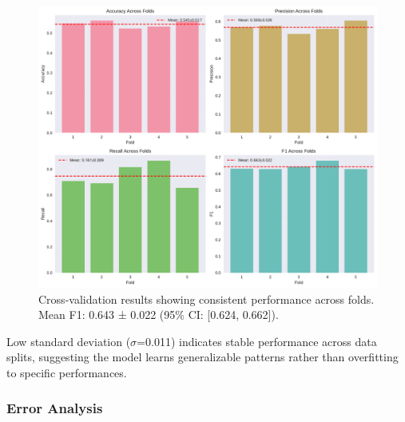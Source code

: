 \documentclass[sigconf,review,anonymous]{acmart}
\begin{document}
\begin{figure}[h]
\centering
\includegraphics[width=\columnwidth]{figures/cross_validation_results.pdf}
\caption{Cross-validation results showing consistent performance across folds. Mean F1: 0.643 ± 0.022 (95\% CI: [0.624, 0.662]).}
\label{fig:crossval}
\end{figure}

Low standard deviation ($\sigma$=0.011) indicates stable performance across data splits, suggesting the model learns generalizable patterns rather than overfitting to specific performances.

\subsubsection{Error Analysis}
\end{document}
